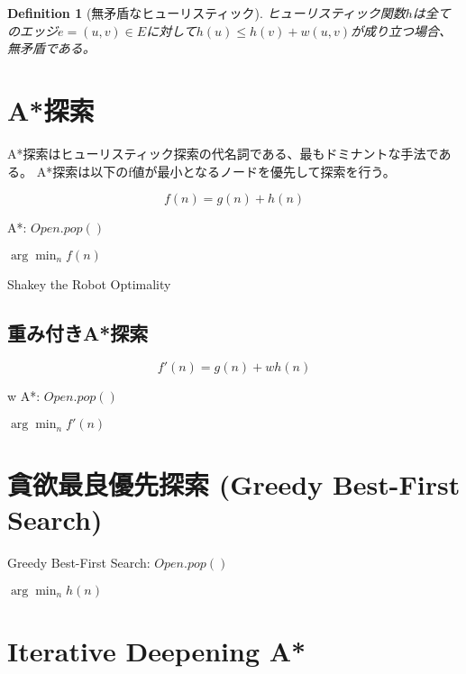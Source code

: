 \documentclass{book}
\newtheorem{definition}{Definition}
\begin{document}
\begin{definition}[無矛盾なヒューリスティック]
ヒューリスティック関数$h$は全てのエッジ$e = (u, v) \in E$に対して$h(u) \leq h(v) + w(u,v)$が成り立つ場合、無矛盾である。
\end{definition}


\section{A*探索}
A*探索はヒューリスティック探索の代名詞である、最もドミナントな手法である。
A*探索は以下のf値が最小となるノードを優先して探索を行う。

\begin{equation}
	f(n) = g(n) + h(n)
\end{equation}

\begin{algorithm}
\caption{A*: $Open.pop()$}
\label{alg:astar-open}
	\Return $\arg \min_n f(n)$
\end{algorithm}

Shakey the Robot
Optimality





\subsection{重み付きA*探索}

\begin{equation}
	f'(n) = g(n) + w h(n)
\end{equation}

\begin{algorithm}
\caption{w A*: $Open.pop()$}
\label{alg:wastar-open}
	\Return $\arg \min_n f'(n)$
\end{algorithm}

\section{貪欲最良優先探索 (Greedy Best-First Search)}

\begin{algorithm}
\caption{Greedy Best-First Search: $Open.pop()$}
\label{alg:gfs-open}
	\Return $\arg \min_n h(n)$
\end{algorithm}


\section{Iterative Deepening A*}
\end{document}
